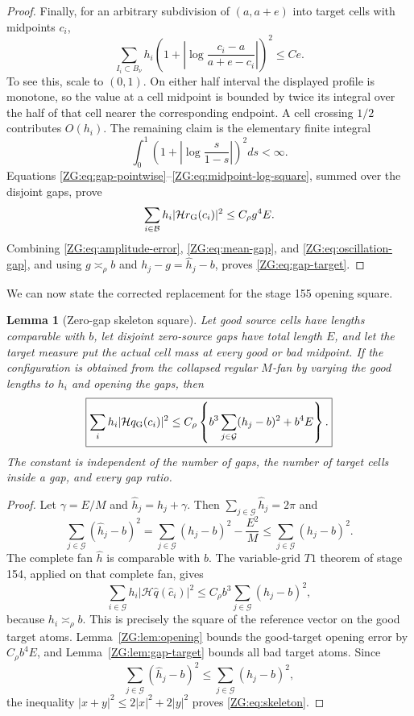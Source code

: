 \documentclass[11pt]{amsart}
\numberwithin{equation}{section}
\newtheorem{lemma}[theorem]{Lemma}
\theoremstyle{definition}
\theoremstyle{remark}
\newcommand{\Hil}{\mathcal H}
\begin{document}
\begin{proof}
Finally, for an arbitrary subdivision of $(a,a+e)$ into target cells
with midpoints $c_i$,
\begin{equation}\label{ZG:eq:midpoint-log-square}
 \sum_{I_i\subset B_\nu}h_i
 \left(1+\left|\log
 \frac{c_i-a}{a+e-c_i}\right|\right)^2
 \le Ce.
\end{equation}
To see this, scale to $(0,1)$.  On either half interval the displayed
profile is monotone, so the value at a cell midpoint is bounded by twice
its integral over the half of that cell nearer the corresponding
endpoint.  A cell crossing $1/2$ contributes $O(h_i)$.  The remaining
claim is the elementary finite integral
\[
 \int_0^1\left(1+\left|\log\frac{s}{1-s}\right|\right)^2ds<\infty.
\]
Equations \eqref{ZG:eq:gap-pointwise}--\eqref{ZG:eq:midpoint-log-square},
summed over the disjoint gaps, prove
\begin{equation}\label{ZG:eq:oscillation-gap}
 \sum_{i\in\mathcal B}h_i|\Hil r_{\rm G}(c_i)|^2
 \le C_\rho g^4E.
\end{equation}
Combining \eqref{ZG:eq:amplitude-error}, \eqref{ZG:eq:mean-gap}, and
\eqref{ZG:eq:oscillation-gap}, and using $g\asymp_\rho b$ and
$h_j-g=\widehat h_j-b$, proves \eqref{ZG:eq:gap-target}.
\end{proof}

We can now state the corrected replacement for the stage 155 opening
square.

\begin{lemma}[Zero-gap skeleton square]\label{ZG:lem:skeleton}
Let good source
cells have lengths comparable with $b$, let disjoint
zero-source gaps have total length $E$, and let the target measure put
the actual cell mass at every good or bad midpoint.  If the configuration
is obtained from the collapsed regular $M$-fan by varying the good
lengths to $h_i$ and opening the gaps, then
\begin{equation}\label{ZG:eq:skeleton}
 \boxed{
 \sum_i h_i|\Hil q_{\rm G}(c_i)|^2
 \le C_\rho\left\{
 b^3\sum_{j\in\mathcal G}(h_j-b)^2+b^4E\right\}.}
\end{equation}
The constant is independent of the number of gaps, the number of
target cells inside a gap, and every gap ratio.
\end{lemma}

\begin{proof}
Let $\gamma=E/M$ and $\widehat h_j=h_j+\gamma$.  Then
$\sum_{j\in\mathcal G}\widehat h_j=2\pi$ and
\[
 \sum_{j\in\mathcal G}(\widehat h_j-b)^2
 =\sum_{j\in\mathcal G}(h_j-b)^2-\frac{E^2}{M}
 \le\sum_{j\in\mathcal G}(h_j-b)^2.
\]
The complete fan $\widehat h$ is comparable with $b$.  The variable-grid
$T1$ theorem of stage 154, applied on that complete fan, gives
\[
 \sum_{i\in\mathcal G}h_i
 |\Hil\widehat q(\widehat c_i)|^2
 \le C_\rho b^3
 \sum_{j\in\mathcal G}(h_j-b)^2,
\]
because $h_i\asymp_\rho b$.  This is precisely the square of the
reference vector on the good target atoms.  Lemma~\ref{ZG:lem:opening}
bounds the good-target opening error by $C_\rho b^4E$, and
Lemma~\ref{ZG:lem:gap-target} bounds all bad target atoms.  Since
\[
 \sum_{j\in\mathcal G}(\widehat h_j-b)^2
 \le\sum_{j\in\mathcal G}(h_j-b)^2,
\]
the inequality $|x+y|^2\le2|x|^2+2|y|^2$ proves
\eqref{ZG:eq:skeleton}.
\end{proof}
\end{document}
